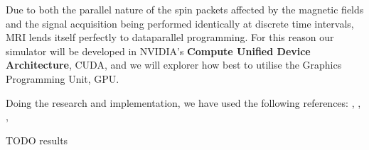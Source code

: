 
Due to both the parallel nature of the spin packets affected by the
magnetic fields and the signal acquisition being performed identically
at discrete time intervals, MRI lends itself perfectly to dataparallel
programming. For this reason our simulator will be developed in
NVIDIA's \textbf{Compute Unified Device Architecture}, CUDA, and we
will explorer how best to utilise the Graphics Programming Unit, GPU.


Doing the research and implementation, we have used the following
references: \cite{HaackeBook99}, \cite{feeman}, \cite{aibinu-mri},
\cite{benoit2005simri}

TODO results

